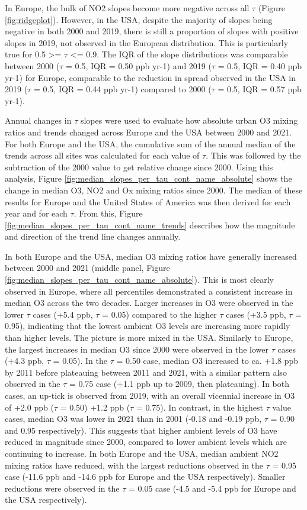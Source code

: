 \documentclass[journal abbreviation, manuscript]{copernicus}
\begin{document}
In Europe, the bulk of NO2 slopes become more negative across all $\tau$ (Figure \ref{fig:ridgeplot}). However, in the USA, despite the majority of slopes being negative in both 2000 and 2019, there is still a proportion of slopes with positive slopes in 2019, not observed in the European distribution. This is particularly true for 0.5 >= $\tau$ <= 0.9. The IQR of the slope distributions was comparable between 2000 ($\tau$ = 0.5, IQR = 0.50 ppb yr-1) and 2019 ($\tau$ = 0.5, IQR = 0.40 ppb yr-1) for Europe, comparable to the reduction in spread observed in the USA in 2019 ($\tau$ = 0.5, IQR = 0.44 ppb yr-1) compared to 2000 ($\tau$ = 0.5, IQR = 0.57 ppb yr-1).


Annual changes in $\tau$ slopes were used to evaluate how absolute urban O3 mixing ratios and trends changed across Europe and the USA between 2000 and 2021. For both Europe and the USA, the cumulative sum of the annual median of the trends across all sites was calculated for each value of $\tau$. This was followed by the subtraction of the 2000 value to get relative change since 2000. Using this analysis, Figure \ref{fig:median_slopes_per_tau_cont_name_absolute} shows the change in median O3, NO2 and Ox mixing ratios since 2000. The median of these results for Europe and the United States of America was then derived for each year and for each $\tau$. From this, Figure \ref{fig:median_slopes_per_tau_cont_name_trends} describes how the magnitude and direction of the trend line changes annually.

In both Europe and the USA, median O3 mixing ratios have generally increased between 2000 and 2021 (middle panel, Figure \ref{fig:median_slopes_per_tau_cont_name_absolute}). This is most clearly observed in Europe, where all percentiles demonstrated a consistent increase in median O3 across the two decades. Larger increases in O3 were observed in the lower $\tau$ cases (+5.4 ppb, $\tau$ = 0.05) compared to the higher $\tau$ cases (+3.5 ppb, $\tau$ = 0.95), indicating that the lowest ambient O3 levels are increasing more rapidly than higher levels. The picture is more mixed in the USA. Similarly to Europe, the largest increases in median O3 since 2000 were observed in the lower $\tau$ cases (+4.3 ppb, $\tau$ = 0.05). In the $\tau$ = 0.50 case, median O3 increased to ca. +1.8 ppb by 2011 before plateauing between 2011 and 2021, with a similar pattern also observed in the $\tau$ = 0.75 case (+1.1 ppb up to 2009, then plateauing). In both cases, an up-tick is observed from 2019, with an overall vicennial increase in O3 of +2.0 ppb ($\tau$ = 0.50) +1.2 ppb ($\tau$ = 0.75). In contrast, in the highest $\tau$ value cases, median O3 was lower in 2021 than in 2001 (-0.18 and -0.19 ppb, $\tau$ = 0.90 and 0.95 respectively). This suggests that higher ambient levels of O3 have reduced in magnitude since 2000, compared to lower ambient levels which are continuing to increase. In both Europe and the USA, median ambient NO2 mixing ratios have reduced, with the largest reductions observed in the $\tau$ = 0.95 case (-11.6 ppb and -14.6 ppb for Europe and the USA respectively). Smaller reductions were observed in the $\tau$ = 0.05 case (-4.5 and -5.4 ppb for Europe and the USA respectively).
\end{document}
